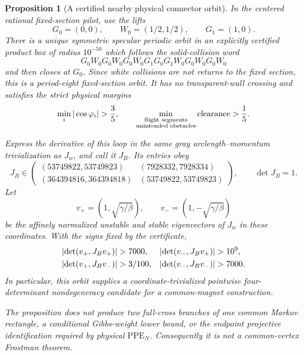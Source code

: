 \documentclass[11pt]{article}
\newtheorem{proposition}[theorem]{Proposition}
\begin{document}
\begin{proposition}[A certified nearby physical connector orbit]
\label{prop:fixed-section-certified-nearby-connector}
In the centered rational fixed-section pilot, use the lifts
\[
 G_0=(0,0),\qquad W_0=(1/2,1/2),\qquad G_1=(1,0).
\]
There is a unique symmetric specular periodic orbit in an explicitly
certified product box of radius $10^{-50}$ which follows the solid-collision
word
\begin{equation}
\label{eq:fixed-section-nearby-connector-word}
 G_0W_0G_0W_0G_0W_0G_1G_0G_1W_0G_0W_0G_0W_0
\end{equation}
and then closes at $G_0$.  Since white collisions are not returns to the
fixed section, this is a period-eight fixed-section orbit.  It has no
transparent-wall crossing and satisfies the strict physical margins
\begin{equation}
\label{eq:fixed-section-nearby-connector-physical-margins}
 \min_i|\cos\varphi_i|>\frac35,
 \qquad
 \min_{\substack{\text{flight segments}\cr
                  \text{unintended obstacles}}}
 \operatorname{clearance}>\frac15.
\end{equation}

Express the derivative of this loop in the same gray
arclength--momentum trivialization as $J_w$, and call it $J_B$.  Its entries
obey
\begin{equation}
\label{eq:fixed-section-nearby-connector-matrix-box}
 J_B\in
 \begin{pmatrix}
  (53749822,53749823)&(7928332,7928334)\\
  (364394816,364394818)&(53749822,53749823)
 \end{pmatrix},
 \qquad \det J_B=1.
\end{equation}
Let
\[
 v_+=(1,\sqrt{\gamma/\beta}),\qquad
 v_-=(1,-\sqrt{\gamma/\beta})
\]
be the affinely normalized unstable and stable eigenvectors of $J_w$ in these
coordinates.  With the signs fixed by the certificate,
\begin{align}
 \left|\det(v_+,J_Bv_+)\right|&>7000,&
 \left|\det(v_-,J_Bv_+)\right|&>10^9,\notag\\
 \left|\det(v_+,J_Bv_-)\right|&>3/100,&
 \left|\det(v_-,J_Bv_-)\right|&>7000.
 \label{eq:fixed-section-nearby-connector-twisting}
\end{align}
In particular, this orbit supplies a coordinate-trivialized pointwise
four-determinant nondegeneracy candidate for a common-magnet construction.

The proposition does not produce two full-cross branches of one common
Markov rectangle, a conditional Gibbs-weight lower bound, or the endpoint
projective identification required by physical $\mathrm{PPE}_N$.
Consequently it is not a common-vertex Frostman theorem.
\end{proposition}
\end{document}
